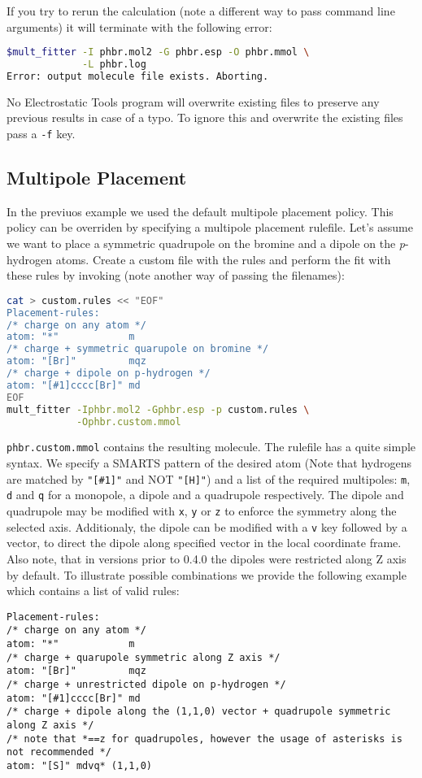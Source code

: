\documentclass[10pt,a4paper]{article}
\begin{document}
If you try to rerun the calculation (note a different way to pass command line arguments) 
it will terminate with the following error:
\begin{lstlisting}[language=bash]
$mult_fitter -I phbr.mol2 -G phbr.esp -O phbr.mmol \
             -L phbr.log
Error: output molecule file exists. Aborting.
\end{lstlisting}
No Electrostatic Tools program will overwrite existing files to preserve any previous 
results in case
of a typo. To ignore this and overwrite the existing files pass a \lstinline{-f} key.

\subsection{Multipole Placement}
In the previuos example we used the default multipole placement policy. This policy can be
overriden by specifying a multipole placement rulefile. Let's assume we want to place a
symmetric quadrupole on the bromine and a dipole on the \textit{p}-hydrogen atoms. 
Create a custom file with the rules and perform the fit with these rules by invoking (note 
another way of passing the filenames):
\begin{lstlisting}[language=bash]
cat > custom.rules << "EOF"
Placement-rules:
/* charge on any atom */
atom: "*"            m 
/* charge + symmetric quarupole on bromine */ 
atom: "[Br]"         mqz
/* charge + dipole on p-hydrogen */
atom: "[#1]cccc[Br]" md
EOF
mult_fitter -Iphbr.mol2 -Gphbr.esp -p custom.rules \
            -Ophbr.custom.mmol
\end{lstlisting}
\lstinline{phbr.custom.mmol} contains the resulting molecule. The rulefile has a quite
simple syntax. We specify a SMARTS pattern of the desired atom (Note that hydrogens are
matched by \lstinline{"[#1]"} and NOT \lstinline{"[H]"}) and a list of the required 
multipoles: 
\lstinline{m}, \lstinline{d} and \lstinline{q} for a monopole, a dipole and a quadrupole 
respectively. The dipole and quadrupole may be modified with \lstinline{x}, \lstinline{y} 
or \lstinline{z} to enforce the symmetry along the selected axis. Additionaly, the dipole 
can be modified with a \lstinline{v} key followed by a vector, to direct the dipole along 
specified vector in the local coordinate frame. Also note, that in versions prior to 0.4.0
the dipoles were restricted along Z axis by default. To illustrate possible combinations 
we provide the following example which contains a list of valid rules:
\begin{lstlisting}[style=file]
Placement-rules:
/* charge on any atom */
atom: "*"            m 
/* charge + quarupole symmetric along Z axis */ 
atom: "[Br]"         mqz   
/* charge + unrestricted dipole on p-hydrogen */
atom: "[#1]cccc[Br]" md
/* charge + dipole along the (1,1,0) vector + quadrupole symmetric along Z axis */
/* note that *==z for quadrupoles, however the usage of asterisks is not recommended */
atom: "[S]" mdvq* (1,1,0)

\end{lstlisting}
\end{document}
